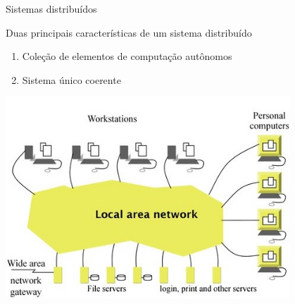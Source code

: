 \documentclass[compress]{beamer}
\begin{document}
\begin{frame}{Sistemas distribuídos}

Duas principais características de um sistema distribuído

\begin{enumerate}
    \item Coleção de elementos de computação autônomos
    \item Sistema único coerente
\end{enumerate}

\centering\includegraphics[width=0.8\textwidth]{images/laboratorio.jpg}

\end{frame}

\end{document}
